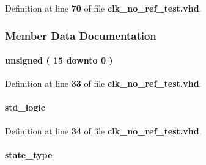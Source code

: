 Definition at line {\bf 70} of file {\bf clk\+\_\+no\+\_\+ref\+\_\+test.\+vhd}.



\subsubsection{Member Data Documentation}
\paragraph[{cnt}]{ {\bfseries \textcolor{comment}{unsigned}\textcolor{vhdlchar}{ }\textcolor{vhdlchar}{(}\textcolor{vhdlchar}{ }\textcolor{vhdlchar}{ } \textcolor{vhdldigit}{15} \textcolor{vhdlchar}{ }\textcolor{keywordflow}{downto}\textcolor{vhdlchar}{ }\textcolor{vhdlchar}{ } \textcolor{vhdldigit}{0} \textcolor{vhdlchar}{ }\textcolor{vhdlchar}{)}\textcolor{vhdlchar}{ }} \hspace{0.3cm}{\ttfamily [Signal]}}\label{classclk__no__ref__test_1_1arch_ab542534ef27a544efb82f82536b78dd3}


Definition at line {\bf 33} of file {\bf clk\+\_\+no\+\_\+ref\+\_\+test.\+vhd}.

\paragraph[{cnt\+\_\+en}]{ {\bfseries \textcolor{comment}{std\+\_\+logic}\textcolor{vhdlchar}{ }} \hspace{0.3cm}{\ttfamily [Signal]}}\label{classclk__no__ref__test_1_1arch_ae3de1c53c7fb65479eaae726c7d77688}


Definition at line {\bf 34} of file {\bf clk\+\_\+no\+\_\+ref\+\_\+test.\+vhd}.

\paragraph[{current\+\_\+state}]{ {\bfseries {\bfseries {\bf state\+\_\+type}} \textcolor{vhdlchar}{ }} \hspace{0.3cm}{\ttfamily [Signal]}}\label{classclk__no__ref__test_1_1arch_a7ede5b91aac1f3d1b2a884a5e191d554}


